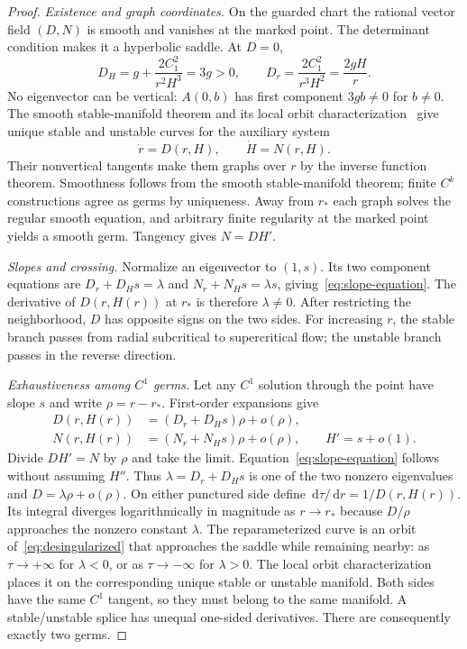 \documentclass[12pt,a4paper,oneside]{report}
\numberwithin{equation}{chapter}
\theoremstyle{remark}\newtheorem{remark}[theorem]{Remark}
\newcommand{\dd}{\,\mathrm d}
\begin{document}
\begin{proof}
\emph{Existence and graph coordinates.} On the guarded chart the rational
vector field $(D,N)$ is smooth and vanishes at the marked point. The
determinant condition makes it a hyperbolic saddle. At $D=0$,
\begin{equation}\label{eq:critical-derivatives}
 D_H=g+\frac{2C_1^2}{r^2H^3}=3g>0,
 \qquad D_r=\frac{2C_1^2}{r^3H^2}=\frac{2gH}{r}.
\end{equation}
No eigenvector can be vertical: $A(0,b)$ has first component $3gb\ne0$
for $b\ne0$. The smooth stable-manifold theorem and its local orbit
characterization~\cite[Theorems~9.4--9.5, p.~259]{teschl2012} give unique
stable and unstable curves for the auxiliary system
\begin{equation}\label{eq:desingularized}
 \dot r=D(r,H),\qquad \dot H=N(r,H).
\end{equation}
Their nonvertical tangents make them graphs over $r$ by the inverse function
theorem. Smoothness follows from the smooth stable-manifold theorem; finite
$C^k$ constructions agree as germs by uniqueness. Away from $r_*$ each graph
solves the regular smooth equation, and arbitrary finite regularity at the
marked point yields a smooth germ. Tangency gives $N=DH'$.

\emph{Slopes and crossing.} Normalize an eigenvector to $(1,s)$.
Its two component equations are $D_r+D_Hs=\lambda$ and
$N_r+N_Hs=\lambda s$, giving~\eqref{eq:slope-equation}. The derivative
of $D(r,H(r))$ at $r_*$ is therefore $\lambda\ne0$. After restricting
the neighborhood, $D$ has opposite signs on the two sides. For increasing
$r$, the stable branch passes from radial subcritical to supercritical
flow; the unstable branch passes in the reverse direction.

\emph{Exhaustiveness among $C^1$ germs.} Let any $C^1$ solution through the
point have slope $s$ and write $\rho=r-r_*$. First-order expansions give
\[
 \begin{aligned}
 D(r,H(r))&=(D_r+D_Hs)\rho+o(\rho),\\
 N(r,H(r))&=(N_r+N_Hs)\rho+o(\rho),\qquad H'=s+o(1).
 \end{aligned}
\]
Divide $DH'=N$ by $\rho$ and take the limit. Equation~\eqref{eq:slope-equation}
follows without assuming $H''$. Thus $\lambda=D_r+D_Hs$ is one of the
two nonzero eigenvalues and $D=\lambda\rho+o(\rho)$.
On either punctured side define $\dd\tau/\dd r=1/D(r,H(r))$.
Its integral diverges logarithmically in magnitude as $r\to r_*$ because
$D/\rho$ approaches the nonzero constant $\lambda$.
The reparameterized curve is an orbit of~\eqref{eq:desingularized} that
approaches the saddle while remaining nearby: as $\tau\to+\infty$ for
$\lambda<0$, or as $\tau\to-\infty$ for $\lambda>0$.
The local orbit characterization places it on the corresponding unique
stable or unstable manifold. Both sides have the same $C^1$ tangent,
so they must belong to the same manifold. A stable/unstable splice has
unequal one-sided derivatives. There are consequently exactly two germs.


\end{proof}
\end{document}
